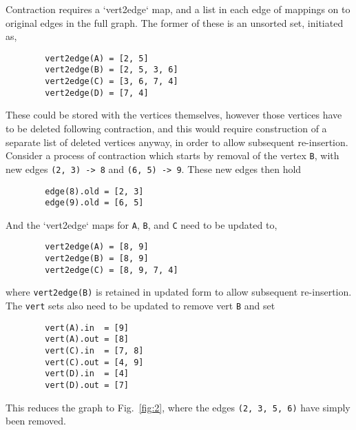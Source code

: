     \noindent Contraction requires a `vert2edge` map, and a list in each edge of mappings on to original edges in the full graph. The former of
    these is an unsorted set, initiated as,
    \begin{lstlisting}
        vert2edge(A) = [2, 5]
        vert2edge(B) = [2, 5, 3, 6]
        vert2edge(C) = [3, 6, 7, 4]
        vert2edge(D) = [7, 4]
    \end{lstlisting}
    These could be stored with the vertices themselves, however those vertices have to be deleted following contraction, and this would require
    construction of a separate list of deleted vertices anyway, in order to allow subsequent re-insertion.  Consider a process of contraction
    which starts by removal of the vertex {\tt B}, with new edges {\tt(2, 3) -> 8} and {\tt(6, 5) -> 9}. These new edges then hold
    \begin{lstlisting}
        edge(8).old = [2, 3]
        edge(9).old = [6, 5]
    \end{lstlisting}
    And the `vert2edge` maps for {\tt A}, {\tt B}, and {\tt C} need to be updated to,
    \begin{lstlisting}
        vert2edge(A) = [8, 9]
        vert2edge(B) = [8, 9]
        vert2edge(C) = [8, 9, 7, 4]
    \end{lstlisting}
    where {\tt vert2edge(B)} is retained in updated form to allow subsequent re-insertion. The {\tt vert} sets also need to be updated to remove
    vert {\tt B} and set
    \begin{lstlisting}
        vert(A).in  = [9]
        vert(A).out = [8]
        vert(C).in  = [7, 8]
        vert(C).out = [4, 9]
        vert(D).in  = [4]
        vert(D).out = [7]
    \end{lstlisting}
    This reduces the graph to Fig.~\ref{fig:2}, where the edges {\tt(2, 3, 5, 6)} have simply been removed.

    

